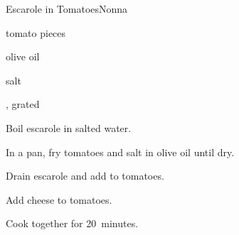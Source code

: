 \begin{recipe}{Escarole in Tomatoes}{Nonna}{}

\begin{ingredients}
\item {}
\item tomato pieces
\item olive oil
\item salt
\item {}, grated
\end{ingredients}

\begin{directions}
\item Boil escarole in salted water.
\item In a pan, fry tomatoes and salt in olive oil until dry.
\item Drain escarole and add to tomatoes.
\item Add cheese to tomatoes.
\item Cook together for 20~minutes.
\end{directions}

\end{recipe}
